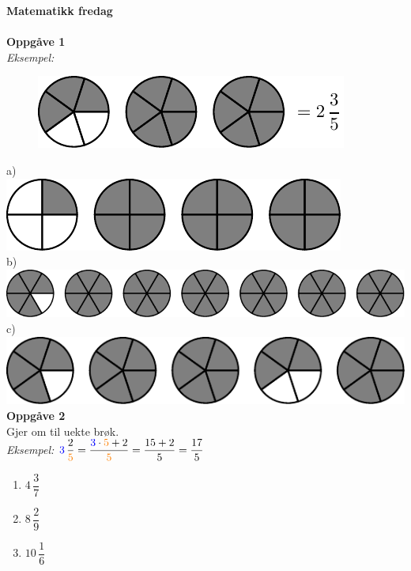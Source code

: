 \documentclass[english,hidelinks,pdftex, 11 pt, class=report,crop=false]{standalone}
\begin{document}
\huge \textbf{Matematikk fredag}\\
 \\[25pt]
\large
{\Large \textbf{Oppgåve 1}}\\[10pt]
\textit{Eksempel:}
\begin{figure}
	\includegraphics[]{bra}
\end{figure}
a) \\\includegraphics[]{brb} \\
b) \\\includegraphics[]{brc}
c) \\\includegraphics[]{brd}
\\[25pt]
{\Large \textbf{Oppgåve 2}}\\[10pt]
Gjer om til uekte brøk.\\[5pt]
\textit{Eksempel:} $ \displaystyle {\color{blue}3}\,\frac{2}{\color{orange}5}=\frac{{\color{blue}3}\cdot{\color{orange}5}+2}{\color{orange}5}=\frac{15+2}{5}=\frac{17}{5} $
\begin{enumerate}[label=\alph*)]
	\item $ 4\,\dfrac{3}{7} $ \\[5pt]
	\item $ 8\,\dfrac{2}{9} $ \\[5pt]
	\item $ 10\,\dfrac{1}{6} $ \\[5pt]	
	
	
\end{enumerate}
\end{document}
